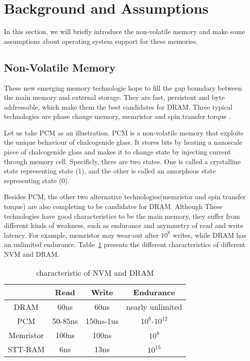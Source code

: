 \documentclass{vldb}
\begin{document}

\section{Background and Assumptions}

In this section, we will briefly introduce the non-volatile memory and
make some assumptions about operating system support for these memories.

\subsection{Non-Volatile Memory}

These new emerging memory technologie hope to fill the gap boundary between the main memory and external storage.
They are fast, persistent and byte addressable, which make them the best candidates for DRAM.
Three typical technologies are phase change memory, memristor and spin transfer torque .

Let us take PCM as an illustration. PCM is a non-volatile memory that exploits the unique behaviour of chalcogenide glass.
It stores bits by heating a nanoscale piece of chalcogenide glass and makes it to change state by injecting current through memory cell.
Specificly, there are two states.
One is called a crystalline state representing state (1), and the other is called an amorphous state representing state (0).

Besides PCM, the other two alternative technologies(memristor and spin transfer torque) are also completing to be candidates for DRAM.
Although These technologies have good characteristics to be the main memory, they suffer from different kinds of weakness, such as endurance and asymmetry of read and write latency. 
For example, memristor may wear-out after $10^8$ writes, while DRAM has an unlimited endurance.
Table~\ref{tab:NVMvsDRAM} presents the different characteristics of different NVM and DRAM.

\begin{table}[h]
    \centering
    \begin{tabular}{|c|c|c|c|} \hline
        & Read & Write & Endurance\\ \hline
        DRAM & 60ns & 60ns & nearly unlimited\\ \hline
        PCM & 50-85ns & 150ns-1us & $10^8$-$10^{12}$\\ \hline
        Memristor & 100ns & 100ns & $10^8$\\ \hline
        STT-RAM & 6ns & 13ns & $10^{15}$\\ \hline
    \end{tabular}
    \caption{characteristic of NVM and DRAM}
\label{tab:NVMvsDRAM}
\end{table}
\end{document}
